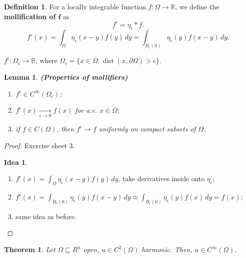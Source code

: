\documentclass[12pt]{article}
\DeclareMathOperator{\dist}{dist}
\newtheorem{lemma}{Lemma}[section]
\newtheorem{theorem}{Theorem}[section]
\theoremstyle{definition}
\newtheorem*{definition*}{Definition}
\newtheorem*{idea}{Idea}
\begin{document}
\begin{definition*}
For a locally integrable function $f:\Omega\rightarrow\mathbb R$, we define the \textbf{mollification of $\boldsymbol f$} as
\[f^\epsilon=\eta_\epsilon*f.\]
\[f^\epsilon(x)=\int_\Omega\eta_\epsilon(x-y)f(y)\,dy=\int_{B_\epsilon(0)}\eta_\epsilon(y)f(x-y)\,dy.\]

$f^\epsilon:\Omega_\epsilon\rightarrow\mathbb R$, where $\Omega_\epsilon=\{x\in\Omega:\dist(x,\partial\Omega)>\epsilon\}$.
\end{definition*}

\begin{lemma}\label{properties_mollifier}
\emph{\textbf{(Properties of mollifiers)}}
\begin{enumerate}[label=(\roman*)]
\item\label{mollifier_differentiable} $f^\epsilon\in C^\infty(\Omega_\epsilon)$;
\item\label{mollifier_conv_point} $f^\epsilon(x)\xrightarrow[\epsilon\to0]{}f(x)$ for a.e. $x\in\Omega$;
\item if $f\in C(\Omega)$, then $f^\epsilon\rightarrow f$ uniformly on compact subsets of $\Omega$.
\end{enumerate}
\end{lemma}

\begin{proof}
Exercise sheet 3.

\begin{idea}
\begin{enumerate}[label=(\roman*)]
\item $f^\epsilon(x)=\int_\Omega\eta_\epsilon(x-y)f(y)\,dy$, take derivatives inside onto $\eta_\epsilon$;
\item $f^\epsilon(x)=\int_{B_\epsilon(0)}\eta_\epsilon(y)f(x-y)\,dy\approx\int_{B_\epsilon(0)}\eta_\epsilon(y)f(x)\,dy=f(x)$;
\item same idea as before.
\end{enumerate}
\end{idea}
\end{proof}

\begin{theorem}\label{harmonic_infdiff}
Let $\Omega\subseteq R^n$ open, $u\in C^2(\Omega)$ harmonic. Then, $u\in C^\infty(\Omega)$.
\end{theorem}
\end{document}
